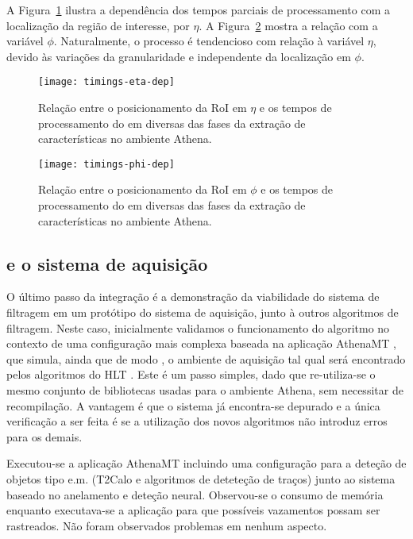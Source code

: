 A Figura~\ref{fig:timings-eta-dep} ilustra a dependência dos tempos parciais
de processamento com a localização da região de interesse, por $\eta$. A
Figura~\ref{fig:timings-phi-dep} mostra a relação com a variável
$\phi$. Naturalmente, o processo é tendencioso com relação à variável $\eta$,
devido às variações da granularidade e independente da localização em $\phi$.

\begin{figure}
\begin{center}
\texttt{[image: timings-eta-dep]}
\end{center}
\caption{Relação entre o posicionamento da RoI em $\eta$ e os tempos de
processamento do  em diversas das fases da extração de
características no ambiente Athena.}
\label{fig:timings-eta-dep}
\end{figure}

\begin{figure}
\begin{center}
\texttt{[image: timings-phi-dep]}
\end{center}
\caption{Relação entre o posicionamento da RoI em $\phi$ e os tempos de
processamento do  em diversas das fases da extração de
características no ambiente Athena.}
\label{fig:timings-phi-dep}
\end{figure}

\subsection{ e o sistema de aquisição}

O último passo da integração é a demonstração da viabilidade do sistema de
filtragem em um protótipo do sistema de aquisição, junto à outros algoritmos
de filtragem. Neste caso, inicialmente validamos o funcionamento do algoritmo
no contexto de uma configuração mais complexa baseada na aplicação AthenaMT
\cite{aa:tns-2004-2}, que simula, ainda que de modo , o ambiente
de aquisição tal qual será encontrado pelos algoritmos do HLT
. Este é um passo simples, dado que re-utiliza-se o mesmo conjunto
de bibliotecas usadas para o ambiente Athena, sem necessitar de
recompilação. A vantagem é que o sistema já encontra-se depurado e a única
verificação a ser feita é se a utilização dos novos algoritmos não introduz
erros para os demais.

Executou-se a aplicação AthenaMT incluindo uma configuração para a deteção de
objetos tipo e.m. (T2Calo e algoritmos de deteteção de traços) junto ao
sistema baseado no anelamento e deteção neural. Observou-se o consumo de
memória enquanto executava-se a aplicação para que possíveis vazamentos possam
ser rastreados. Não foram observados problemas em nenhum aspecto.


